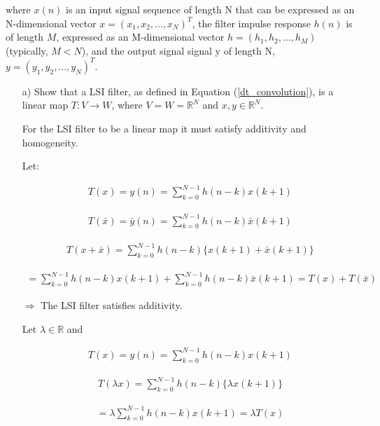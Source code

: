 \documentclass[fleqn]{article}
\begin{document}
\begin{enumerate}[nolistsep]
		where $x(n)$ is an input signal sequence of length N that can be expressed as an N-dimensional vector $x = (x_1, x_2, ..., x_N)^T$, the filter impulse response $h(n)$ is of length $M$, expressed as an M-dimensional vector $h = (h_1, h_2, ..., h_M)$ (typically, $M < N$), and the output signal signal y of length N, $y = (y_1, y_2, ..., y_N)^T$.
		
		\pagebreak
		\begin{enumerate}
			\item[a)] Show that a LSI filter, as defined in Equation (\ref{dt_convolution}), is a linear map $T : V \rightarrow W$, where $V = W = \mathbb{R}^N$ and $x,y \in \mathbb{R}^N$.
			
			For the LSI filter to be a linear map it must satisfy additivity and homogeneity.
			
			Let:
			
			\begin{align*}
				T(x) = y(n) = \sum_{k=0}^{N-1}{h(n-k)x(k+1)}
			\end{align*}
			
			\begin{align*}
				T(\bar{x}) = \bar{y}(n) = \sum_{k=0}^{N-1}{h(n-k)\bar{x}(k+1)}
			\end{align*}
			
			\begin{align*}
				T(x + \bar{x}) = \sum_{k=0}^{N-1}{h(n-k)\{x(k+1) + \bar{x}(k+1)\}}
			\end{align*}
			
			\begin{align*}
				 = \sum_{k=0}^{N-1}{h(n-k)x(k+1)} + \sum_{k=0}^{N-1}{h(n-k)\bar{x}(k+1)} = T(x) + T(\bar{x})
			\end{align*}
			
			$\Rightarrow$ The LSI filter satisfies additivity.
			
			Let $\lambda \in \mathbb{R}$ and
			
			\begin{align*}
				T(x) = y(n) = \sum_{k=0}^{N-1}{h(n-k)x(k+1)}
			\end{align*}
			
			\begin{align*}
				T(\lambda x) = \sum_{k=0}^{N-1}{h(n-k)\{\lambda x(k+1)\}}
			\end{align*}
			
			\begin{align*}
			= \lambda\sum_{k=0}^{N-1}{h(n-k) x(k+1)} = \lambda T(x)
			\end{align*}
			

\end{enumerate}
\end{enumerate}
\end{document}
